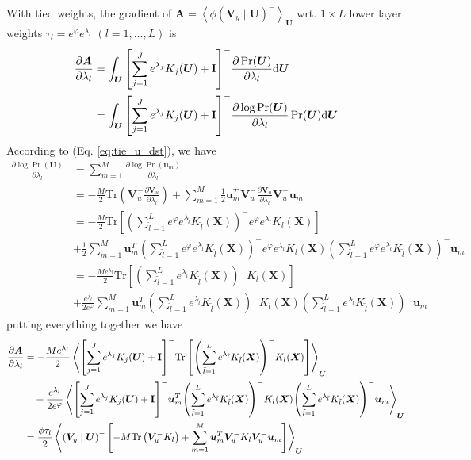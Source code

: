 \documentclass[11pt]{article}
\newcommand{\mean}[2]{\left\langle{#1}\right\rangle_{#2}}
\newcommand{\trb}[1]{\textrm{Tr}\left({#1}\right)}
\newcommand{\trs}[1]{\textrm{Tr}\left[{#1}\right]}
\newcommand{\invb}[1]{{\left({#1}\right)^-}}
\newcommand{\invs}[1]{{\left[{#1}\right]^-}}
\newcommand{\vu}{\boldsymbol{u}}
\newcommand{\xv}{\boldsymbol{V}}
\newcommand{\xx}{\boldsymbol{X}}
\newcommand{\xu}{\boldsymbol{U}}
\newcommand{\xa}{\boldsymbol{A}}
\newcommand{\id}{\textrm{\textbf{I}}}
\newcommand{\PDV}[2]{\frac{\partial #1}{\partial #2}}
\begin{document}
With tied weights, the gradient of $\xa=\mean{\phi\invb{\xv_y\mid\xu}}{\xu}$ wrt. $1 \times L$ lower layer weights $\tau_l = e^{\varphi}e^{\lambda_l}\,\, (l=1, \dots, L)$ is
\begin{equation*} %
  \begin{split}
  \PDV{\xa}{\lambda_l}
  &= \int_{\xu} \invs{\sum_{j=1}^J{e^{\lambda_j} K_j(\xu)} + \id} \PDV{\Pr(\xu)}{\lambda_l} \textrm{d}\xu \\
  &= \int_{\xu} \invs{\sum_{j=1}^J{e^{\lambda_j} K_j(\xu)} + \id} \PDV{\log\Pr(\xu)}{\lambda_l} \Pr(\xu) \textrm{d}\xu
  \end{split}  
\end{equation*}
According to (Eq. \ref{eq:tie_u_dst}), we have
\begin{equation*}
  \begin{split}
    \PDV{\log\Pr(\xu)}{\lambda_l}
    &= \sum_{m=1}^M \PDV{\log\Pr(\vu_m)}{\lambda_l} \\
    &= -\frac{M}{2}\trb{\xv_u^-\PDV{\xv_u}{\lambda_l}} + \sum_{m=1}^M \frac{1}{2}\vu_m^T \xv_u^- \PDV{\xv_u}{\lambda_l} \xv_u^- \vu_m \\
    &= -\frac{M}{2}\trs{ \invb{\sum_{\tilde{l}=1}^L e^{\varphi}e^{\lambda_{\tilde{l}}}K_{\tilde{l}}(\xx)} e^{\varphi}e^{\lambda_l}K_l(\xx)} \\
    &  +\frac{1}{2}\sum_{m=1}^M
    \vu_m^T
    \invb{\sum_{\tilde{l}=1}^L e^{\varphi}e^{\lambda_{\tilde{l}}}K_{\tilde{l}}(\xx)}
    e^{\varphi}e^{\lambda_l}K_l(\xx)
    \invb{\sum_{\tilde{l}=1}^L e^{\varphi}e^{\lambda_{\tilde{l}}}K_{\tilde{l}}(\xx)}
    \vu_m \\
    &= -\frac{Me^{\lambda_l}}{2}\trs{ \invb{\sum_{\tilde{l}=1}^L e^{\lambda_{\tilde{l}}}K_{\tilde{l}}(\xx)} K_l(\xx)} \\
    &  +\frac{e^{\lambda_l}}{2 e^{\varphi}}\sum_{m=1}^M
    \vu_m^T
    \invb{\sum_{\tilde{l}=1}^L e^{\lambda_{\tilde{l}}}K_{\tilde{l}}(\xx)}
    K_l(\xx)
    \invb{\sum_{\tilde{l}=1}^L e^{\lambda_{\tilde{l}}}K_{\tilde{l}}(\xx)}
    \vu_m
  \end{split}
\end{equation*}
putting everything together we have
\begin{equation}\label{eq:tie_lwr_dvt}
  \begin{split}
    \PDV{\xa}{\lambda_l}
    &= -\frac{Me^{\lambda_l}}{2}
    \mean{
      \invs{\sum_{j=1}^J{e^{\lambda_j} K_j(\xu)} + \id}
      \trs{ \invb{\sum_{\tilde{l}=1}^L e^{\lambda_{\tilde{l}}}K_{\tilde{l}}(\xx)} K_l(\xx)}
    }{\xu} \\
    & \quad +\frac{e^{\lambda_l}}{2e^{\varphi}}
    \mean{
      \invs{\sum_{j=1}^J{e^{\lambda_j} K_j(\xu)} + \id}
      \vu_m^T
      \invb{\sum_{\tilde{l}=1}^L e^{\lambda_{\tilde{l}}}K_{\tilde{l}}(\xx)}
      K_l(\xx)
      \invb{\sum_{\tilde{l}=1}^L e^{\lambda_{\tilde{l}}}K_{\tilde{l}}(\xx)}
      \vu_m
    }{\xu} \\
    &= \frac{\phi\tau_l}{2}\mean{
      \invb{\xv_y\mid\xu} \left[-M\trb{\xv_u^-K_l} + \sum_{m=1}^M \vu_m^T \xv_u^- K_l \xv_u^- \vu_m \right]
    }{\xu}
  \end{split}
\end{equation}
\end{document}

